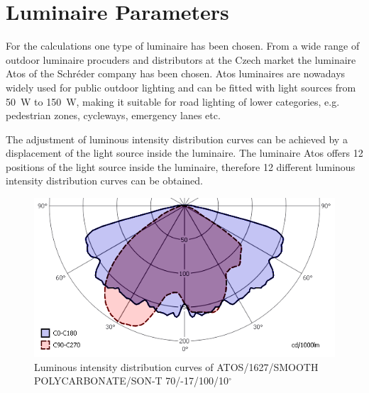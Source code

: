 \section{Luminaire Parameters}
For the calculations one type of luminaire has been chosen. From a wide range of outdoor luminaire procuders and distributors at the Czech market the luminaire Atos of the Schr\'{e}der company has been chosen. Atos luminaires are nowadays widely used for public outdoor lighting and can be fitted with light sources from 50~W to 150~W, making it suitable for road lighting of lower categories, e.g. pedestrian zones, cycleways, emergency lanes etc.

The adjustment of luminous intensity distribution curves can be achieved by a displacement of the light source inside the luminaire. The luminaire Atos offers 12 positions of the light source inside the luminaire, therefore 12 different luminous intensity distribution curves can be obtained.

\begin{figure}[htb]
  \centering
  \includegraphics[width=\columnwidth]{70W_A1_v2}
  \caption{Luminous intensity distribution curves of ATOS/1627/SMOOTH POLYCARBONATE/SON-T 70/-17/100/10$^\circ$}
  \label{fig:lumIntDistr}
\end{figure}

